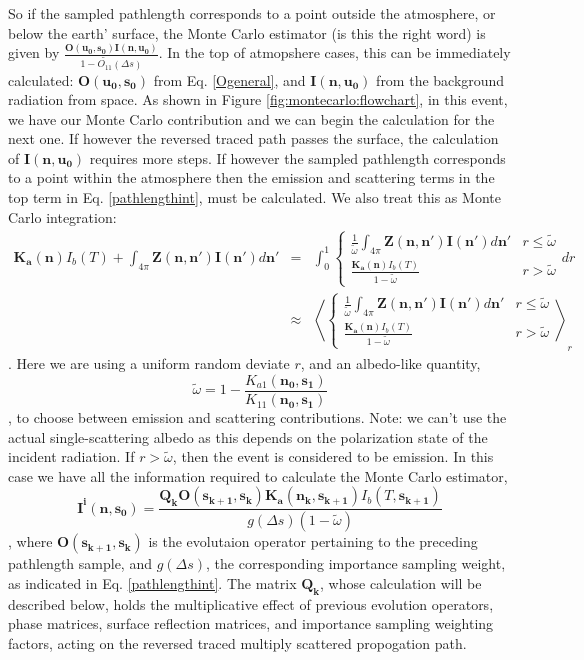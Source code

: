 So if the sampled pathlength corresponds to a point outside the
atmosphere, or below the earth' surface, the Monte Carlo estimator (is this
the right word) is given by
$\frac{\mathbf{O(u_0,s_0)I(n,u_0)}}{1-\tilde{O_{11}}(\Delta s)}$. In the
top of atmopshere cases, this can be immediately calculated:
$\mathbf{O(u_0,s_0)}$ from Eq. \ref{Ogeneral}, and $\mathbf{I(n,u_0)}$ from
  the background radiation from space.  As shown in Figure
  \ref{fig:montecarlo:flowchart}, in this event, we have our Monte
  Carlo contribution and we can begin the calculation for the next
  one.  If however the reversed traced path passes the surface, the
  calculation of $\mathbf{I(n,u_0)}$ requires more steps.
If however the sampled pathlength corresponds to a point within the
atmosphere then the emission and scattering terms in the top term in
Eq. \ref{pathlengthint}, must be calculated.  We also treat this as
Monte Carlo integration:
\begin{eqnarray}
\mathbf{K_a(n)}I_b(T)
+\int_{4\pi}\mathbf{Z(n,n')}\mathbf{I(n')}d\mathbf{n'}&=&\int_0^1\left\{\begin{array}{rl}\frac{1}{\tilde{\omega}}\int_{4\pi}\mathbf{Z(n,n')}\mathbf{I(n')}d\mathbf{n'}
& r \le \tilde{\omega}\\
\frac{\mathbf{K_a(n)}I_b(T)}{1-\tilde{\omega}}& r >
\tilde{\omega}\end{array}dr\right.\nonumber\\
&\approx&\left\langle\left\{\begin{array}{rl}\frac{1}{\tilde{\omega}}\int_{4\pi}\mathbf{Z(n,n')}\mathbf{I(n')}d\mathbf{n'}
& r \le \tilde{\omega}\\
\frac{\mathbf{K_a(n)}I_b(T)}{1-\tilde{\omega}}& r >
\tilde{\omega}\end{array}\right.\right\rangle_r
\label{emiss-or-scatter}
\end{eqnarray}.
Here we are using a uniform random deviate $r$, and an
albedo-like quantity,
\begin{equation}
\tilde{\omega}=1-\frac{K_{a1}(\mathbf{n_{0},s_{1}})}{K_{11}(\mathbf{n_{0},s_{1}})}
\end{equation}
, to choose between emission and scattering contributions.
Note: we can't use the actual single-scattering albedo as this depends
on the polarization state of the incident radiation.  If
$r>\tilde{\omega}$, then the event is considered to be emission.  In
this case we have all the information required to calculate the Monte
Carlo estimator,
\begin{equation}
\mathbf{I^i(n,s_0)}=\frac{\mathbf{Q_k O(s_{k+1},s_k)}
  \mathbf{K_a(n_k,s_{k+1})} I_b(T,\mathbf{s_{k+1}})}
  {g\left(\Delta s\right)\left(1-\tilde{\omega}\right)}
\end{equation}
, where $\mathbf{O(s_{k+1},s_k)}$ is the evolutaion operator
pertaining to the preceding pathlength sample, and $g\left(\Delta
s\right)$, the corresponding importance sampling weight, as indicated
in Eq. \ref{pathlengthint}.  The matrix $\mathbf{Q_k}$, whose
calculation will be described below, holds the
multiplicative effect of previous evolution operators, phase matrices,
surface reflection matrices, and importance sampling weighting
factors, acting on the reversed traced multiply scattered propogation
path. 


